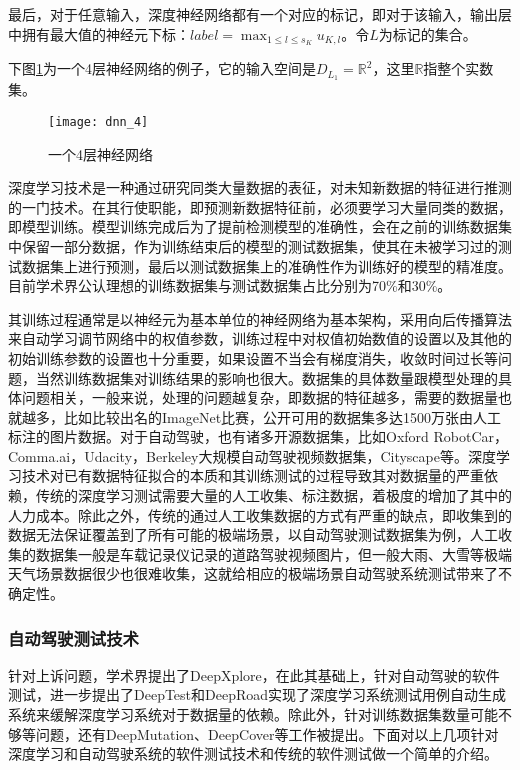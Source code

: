 最后，对于任意输入，深度神经网络都有一个对应的标记，即对于该输入，输出层中拥有最大值的神经元下标：$label=\max_{1\leq l\leq s_K}u_{K,l}$。令$L$为标记的集合。

下图\ref{fig:dnn}为一个4层神经网络的例子，它的输入空间是$D_{L_1}=\mathbb{R}^2$，这里$\mathbb{R}$指整个实数集。
\begin{figure}[h]
    \centering
    \texttt{[image: dnn\_4]}
    \caption{一个4层神经网络}
    \label{fig:dnn}
\end{figure}

深度学习技术是一种通过研究同类大量数据的表征，对未知新数据的特征进行推测的一门技术。在其行使职能，即预测新数据特征前，必须要学习大量同类的数据，即模型训练。模型训练完成后为了提前检测模型的准确性，会在之前的训练数据集中保留一部分数据，作为训练结束后的模型的测试数据集，使其在未被学习过的测试数据集上进行预测，最后以测试数据集上的准确性作为训练好的模型的精准度。目前学术界公认理想的训练数据集与测试数据集占比分别为70\%和30\%\cite{cs231n}。

其训练过程通常是以神经元为基本单位的神经网络为基本架构，采用向后传播算法来自动学习调节网络中的权值参数，训练过程中对权值初始数值的设置以及其他的初始训练参数的设置也十分重要，如果设置不当会有梯度消失，收敛时间过长等问题，当然训练数据集对训练结果的影响也很大。数据集的具体数量跟模型处理的具体问题相关，一般来说，处理的问题越复杂，即数据的特征越多，需要的数据量也就越多，比如比较出名的ImageNet\cite{ImageNet}比赛，公开可用的数据集多达1500万张由人工标注的图片数据。对于自动驾驶，也有诸多开源数据集，比如Oxford RobotCar\cite{ds:oxford}，Comma.ai\cite{ds:ai}，Udacity\cite{udacity_dataset}，Berkeley大规模自动驾驶视频数据集\cite{ds:berkeley}，Cityscape\cite{Cordts2016Cityscapes}等。深度学习技术对已有数据特征拟合的本质和其训练测试的过程导致其对数据量的严重依赖，传统的深度学习测试需要大量的人工收集、标注数据，着极度的增加了其中的人力成本。除此之外，传统的通过人工收集数据的方式有严重的缺点，即收集到的数据无法保证覆盖到了所有可能的极端场景，以自动驾驶测试数据集为例，人工收集的数据集一般是车载记录仪记录的道路驾驶视频图片，但一般大雨、大雪等极端天气场景数据很少也很难收集，这就给相应的极端场景自动驾驶系统测试带来了不确定性。 

\subsubsection{自动驾驶测试技术}

针对上诉问题，学术界提出了DeepXplore，在此其基础上，针对自动驾驶的软件测试，进一步提出了DeepTest和DeepRoad实现了深度学习系统测试用例自动生成系统来缓解深度学习系统对于数据量的依赖。除此外，针对训练数据集数量可能不够等问题，还有DeepMutation\cite{DeepMutation}、DeepCover\cite{DeepCover}等工作被提出。下面对以上几项针对深度学习和自动驾驶系统的软件测试技术和传统的软件测试做一个简单的介绍。

